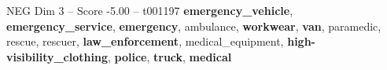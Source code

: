 \begin{textsample}{NEG Dim 3 – Score -5.00 – t001197}  \label{ex:f3_neg_029}
\textbf{emergency\_vehicle}, \textbf{emergency\_service}, \textbf{emergency}, ambulance, \textbf{workwear}, \textbf{van}, paramedic, rescue, rescuer, \textbf{law\_enforcement}, medical\_equipment, \textbf{high-visibility\_clothing}, \textbf{police}, \textbf{truck}, \textbf{medical}

\end{textsample}

